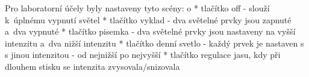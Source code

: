\medskip
\noindent
{\sbf Pro laboratorní účely byly nastaveny tyto scény:}
\begitems \style o
* tlačítko off - slouží k~úplnému vypnutí světel
* tlačítko vyklad - dva světelné prvky jsou zapnuté a~dva vypnuté
* tlačítko pisemka - dva světelné prvky jsou nastaveny na vyšší intenzitu a~dva nižší intenzitu
* tlačítko denní svetlo - každý prvek je nastaven s s jinou intenzitou - od nejnižší po nejvyšší
* tlačítko regulace jasu, kdy při dlouhem stisku se intenzita zvysovala/snizovala
\enditems









